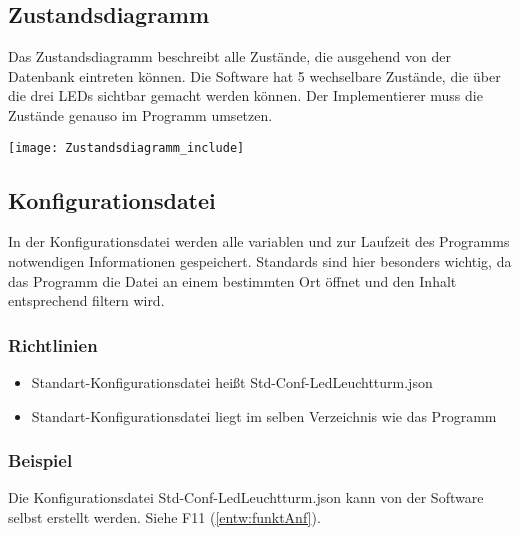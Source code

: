 \documentclass{scrartcl}
\begin{document}
\newpage
\subsection{Zustandsdiagramm}
\label{entw:zstdia}
Das Zustandsdiagramm beschreibt alle Zustände, die ausgehend von der Datenbank eintreten können. Die Software hat 5 wechselbare Zustände, die über die drei LEDs sichtbar gemacht werden können. Der Implementierer muss die Zustände genauso im Programm umsetzen.
\begin{center}
\texttt{[image: Zustandsdiagramm\_include]}
\end{center}

\newpage
\subsection{Konfigurationsdatei}
	In der Konfigurationsdatei werden alle variablen und zur Laufzeit des Programms notwendigen Informationen gespeichert. Standards sind hier besonders wichtig, da das Programm die Datei an einem bestimmten Ort öffnet und den Inhalt entsprechend filtern wird.
\subsubsection*{Richtlinien}
\label{entw:konf}
\begin{itemize}
	\item Standart-Konfigurationsdatei heißt Std-Conf-LedLeuchtturm.json
	\item Standart-Konfigurationsdatei liegt im selben Verzeichnis wie das Programm
\end{itemize}

\subsubsection*{Beispiel}
\label{entw:konfbsp}
Die Konfigurationsdatei Std-Conf-LedLeuchtturm.json kann von der Software selbst erstellt werden. Siehe F11 (\autoref{entw:funktAnf}). 

\end{document}
